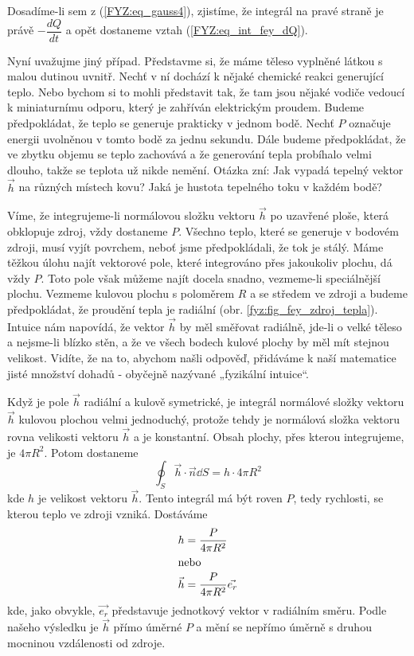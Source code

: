       Dosadíme-li sem z (\ref{FYZ:eq_gauss4}), zjistíme, že integrál na pravé straně je právě
      \(-\dfrac{dQ}{dt}\) a opět dostaneme vztah (\ref{FYZ:eq_int_fey_dQ}).
      
      Nyní uvažujme jiný případ. Představme si, že máme těleso vyplněné látkou s malou dutinou 
      uvnitř. Nechť v ní dochází k nějaké chemické reakci generující teplo. Nebo bychom si to mohli 
      představit tak, že tam jsou nějaké vodiče vedoucí k miniaturnímu odporu, který je zahříván 
      elektrickým proudem. Budeme předpokládat, že teplo se generuje prakticky v jednom bodě. Nechť 
      \(P\) označuje energii uvolněnou v tomto bodě za jednu sekundu. Dále budeme předpokládat, že 
      ve zbytku objemu se teplo zachovává a že generování tepla probíhalo velmi dlouho, takže se 
      teplota už nikde nemění. Otázka zní: Jak vypadá tepelný vektor \(\vec{h}\) na různých místech 
      kovu? Jaká je hustota tepelného toku v každém bodě?
      
      Víme, že integrujeme-li normálovou složku vektoru \(\vec{h}\) po uzavřené ploše, která 
      obklopuje zdroj, vždy dostaneme \(P\). Všechno teplo, které se generuje v bodovém zdroji, musí 
      vyjít povrchem, neboť jsme předpokládali, že tok je stálý. Máme těžkou úlohu najít vektorové 
      pole, které integrováno přes jakoukoliv plochu, dá vždy \(P\). Toto pole však můžeme najít 
      docela snadno, vezmeme-li speciálnější plochu. Vezmeme kulovou plochu s poloměrem \(R\) a se 
      středem ve zdroji a budeme předpokládat, že proudění tepla je radiální (obr. 
      \ref{fyz:fig_fey_zdroj_tepla}). Intuice nám napovídá, že vektor \(\vec{h}\) by měl směřovat 
      radiálně, jde-li o velké těleso a nejsme-li blízko stěn, a že ve všech bodech kulové plochy by 
      měl mít stejnou velikost. Vidíte, že na to, abychom našli odpověď, přidáváme k naší matematice 
      jisté množství dohadů - obyčejně nazývané „fyzikální intuice“.
      
      Když je pole \(\vec{h}\) radiální a kulově symetrické, je integrál normálové složky vektoru 
      \(\vec{h}\) kulovou plochou velmi jednoduchý, protože tehdy je normálová složka vektoru rovna 
      velikosti vektoru \(\vec{h}\) a je konstantní. Obsah plochy, přes kterou integrujeme, je \(4\pi R^2\). 
      Potom dostaneme 
      \begin{equation}\label{FYZ:eq_gauss6}
       \oint_S\vec{h}\cdot\vec{n}\dd{S} = h\cdot4\pi R^2
      \end{equation}
      kde \(h\) je velikost vektoru \(\vec{h}\). Tento integrál má být roven \(P\), tedy rychlosti, 
      se kterou teplo ve zdroji vzniká. Dostáváme
      \begin{align}
       h       &= \frac{P}{4\pi R^2}                \nonumber                  \\
       \shortintertext{nebo}
       \vec{h} &= \frac{P}{4\pi R^2}\vec{e_r}       \label{FYZ:eq_gauss7}
      \end{align} 
      kde, jako obvykle, \(\vec{e_r}\) představuje jednotkový vektor v radiálním směru. Podle našeho 
      výsledku je \(\vec{h}\) přímo úměrné \(P\) a mění se nepřímo úměrně s druhou mocninou 
      vzdálenosti od zdroje.              
      
